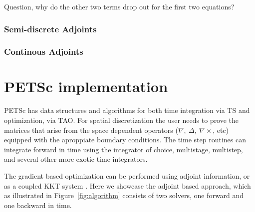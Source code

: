 \documentclass[10pt]{article}
\begin{document}
Question, why do the other two terms drop out for the first two equations?

\subsubsection{Semi-discrete Adjoints}

\subsubsection{Continous Adjoints}



\section{PETSc implementation}

PETSc has data structures and algorithms for both time integration via TS and optimization, via TAO.
For spatial discretization the user needs to prove the matrices that arise from the space dependent operators ($\nabla,\ \Delta,\ \nabla \times$, etc) equipped with the aproppiate boundary conditions. The time step routines can integrate forward in time using the integrator of choice, multistage, multistep, and several other more exotic time integrators.

The gradient based optimization can be performed using adjoint information, or as a coupled KKT system \cite{Haber_2007}. Here we showcase the adjoint based approach, which as illustrated in Figure~\ref{fig:algorithm} consists of two solvers, one forward and one backward in time.
\end{document}
